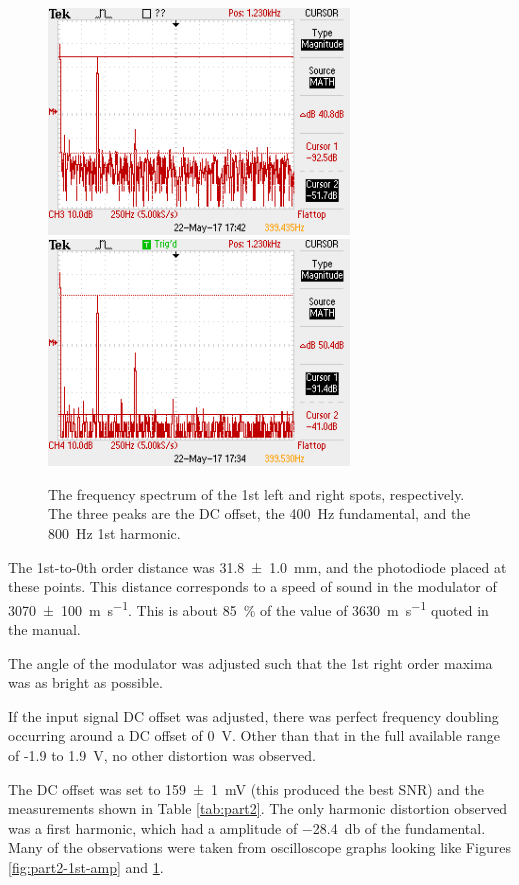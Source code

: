 \documentclass[a4paper]{scrartcl}
\begin{document}
\begin{figure}
    \centering
    \includegraphics[width = 8cm]{1st-left-fft.png}
    \includegraphics[width = 8cm]{1st-right-fft.png}
    \caption{The frequency spectrum of the 1st left and right spots, respectively. The three peaks are the DC offset, the \SI{400}{\hertz} fundamental, and the \SI{800}{\hertz} 1st harmonic.}
    \label{fig:part2-1st-fft}
\end{figure}

The 1st-to-0th order distance was \SI{31.8 \pm 1.0}{\milli\metre}, and the photodiode placed at these points. This distance corresponds to a speed of sound in the modulator of \SI{3070 \pm 100}{\metre\per\second}. This is about \SI{85}{\percent} of the value of \SI{3630}{\metre\per\second} quoted in the manual.

The angle of the modulator was adjusted such that the 1st right order maxima was as bright as possible.

If the input signal DC offset was adjusted, there was perfect frequency doubling occurring around a DC offset of \SI{0}{\volt}. Other than that in the full available range of -1.9 to \SI{1.9}{\volt}, no other distortion was observed.

The DC offset was set to \SI{159 \pm 1}{\milli\volt} (this produced the best SNR) and the measurements shown in Table \ref{tab:part2}. The only harmonic distortion observed was a first harmonic, which had a amplitude of \SI{-28.4}{\decibel} of the fundamental. Many of the observations were taken from oscilloscope graphs looking like Figures \ref{fig:part2-1st-amp} and \ref{fig:part2-1st-fft}.
\end{document}
